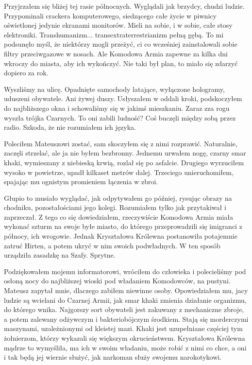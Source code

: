 Przyjrzałem się bliżej tej rasie północnych.
Wyglądali jak brzydcy, chudzi ludzie. Przypominali crackera komputerowego, siedzącego całe życie w piwnicy oświetlonej jedynie ekranami monitorów.
Mieli na sobie, i w sobie, całe stosy elektroniki.
Transhumanizm... transextraterrestrianizm pełną gębą.
To mi podsunęło myśl, że niektórzy mogli przeżyć, ci co wcześniej zainstalowali sobie filtry przeciwgazowe w nosach.
Ale Komodowa Armia zapewne za kilka dni wkroczy do miasta, aby ich wykończyć.
Nie taki był plan, to miało się zdarzyć dopiero za rok.

Wyszliśmy na ulicę. Opadnięte samochody latające, wyłączone hologramy, uduszeni obywatele.
Ani żywej duszy. Usłyszałem w oddali kroki, podskoczyłem do najbliższego okna i schowaliśmy się w jakimś mieszkaniu.
Zaraz zza rogu wyszła trójka Czarnych. To oni zabili ludność?
Coś buczęli między sobą przez radio.
Szkoda, że nie rozumiałem ich języka.

Poleciłem Mateuszowi zostać, sam skoczyłem się z nimi rozprawić.
Naturalnie, zaczęli strzelać, ale ja nie byłem bezbronny.
Jednemu urwałem nogę, czarny smar khaki, wymieszany z niebieską krwią, rozlał się po asfalcie.
Drugiego wyrzuciłem wysoko w powietrze, upadł kilkaset metrów dalej. 
Trzeciego unieruchomiłem, spajając mu ognistym promieniem łączenia w zbroi.

Głupio to musiało wyglądać, jak odpytywałem go później, rysując obrazy na chodniku, pozostałościami jego kolegi.
Rozumiałem tylko jak przytakiwał i zaprzeczał.
Z tego co się dowiedziałem, rzeczywiście Komodowa Armia miała wykonać szturm na swoje byłe miasto, do którego przeprowadzili się imigranci z północy, ich wrogowie.
Jednak Kryształowa Królewna postanowiła potajemnie zatruć Hirten, a potem ukryć w nim swoich podwładnych.
W ten sposób urządziła zasadzkę na Szafy. Sprytne.

Podziękowałem mojemu informatorowi, wróciłem do człowieka i polecieliśmy pod osłoną nocy do najbliższej wioski pod władaniem Komodowców, na pustyni.
Mateusz zapytał mnie, dlaczego zabiłem niewinne osoby.
Opowiedziałem mu, jacy ludzie są wcielani do Czarnej Armii, jak smar khaki zmienia działanie organizmu, do którego wnika.
Najgorszy sort obywateli jest zakuwany z mechaniczne zbroje, a potem zalewany odżywczym i bakteriobójczym środkiem.
Stają się morderczymi maszynami, uzależnionymi od kleistej mazi. Khaki jest uzupełniane częściej tym żołnierzom, którzy wykazali się większym okrucieństwem.
Kryształowa Królewna mądrze to wymyśliła, ma ich w swoim władaniu, może robić z nimi co chce, a oni i tak będą jej wiernie służyć, jak narkoman służy swojemu narokotykowi.

